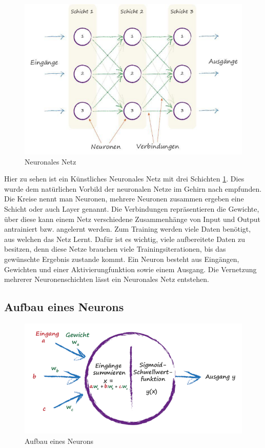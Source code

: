 \begin{figure}[htb]
  \centering  
  \includegraphics[scale=0.5]{img/S36_Buildyourown.png}
  \caption{Neuronales Netz   \cite{rashid2017neuronale}}
  \label{fig:neural_network}
\end{figure}


Hier zu sehen ist ein Künstliches Neuronales Netz mit drei Schichten \ref{fig:neural_network}. Dies wurde dem natürlichen Vorbild der neuronalen Netze im Gehirn nach empfunden. Die Kreise nennt man Neuronen, mehrere Neuronen zusammen ergeben eine Schicht oder auch Layer genannt. Die Verbindungen repräsentieren die Gewichte, über diese kann einem Netz verschiedene Zusammenhänge von Input und Output antrainiert bzw. angelernt werden. Zum Training werden viele Daten benötigt, aus welchen das Netz \glqq Lernt\grqq{}. Dafür ist es wichtig, viele aufbereitete Daten zu besitzen, denn diese Netze brauchen viele Trainingsiterationen, bis das gewünschte Ergebnis zustande kommt. Ein Neuron besteht aus Eingängen, Gewichten und einer Aktivierungfunktion sowie einem Ausgang. Die Vernetzung mehrerer Neuronenschichten lässt ein Neuronales Netz entstehen.

\newpage



\subsection{Aufbau eines Neurons}
\begin{figure}[htb]
  \centering  
  \includegraphics[scale=0.5]{img/S41_Buildyourown.png}
  \caption{Aufbau eines Neurons  \cite{rashid2017neuronale}}
  \label{fig:neuron}

\end{figure}
